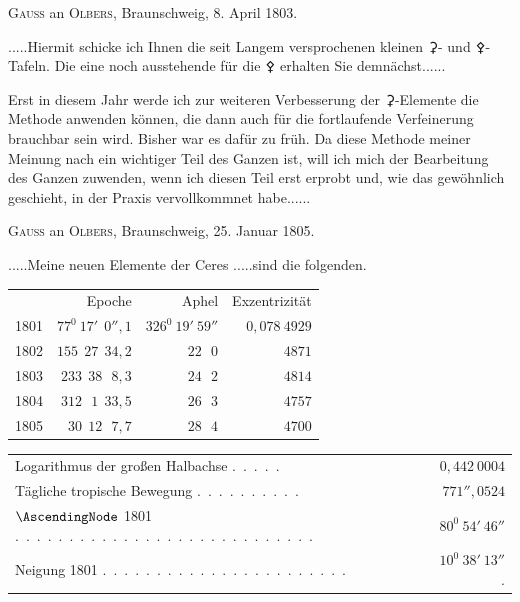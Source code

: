 \begin{center}
\textsc{Gauss} an \textsc{Olbers}, Braunschweig, 8. April 1803.
\end{center}
\noindent\hspace*{\parindent}.\quad.\quad.\quad.\quad.\quad Hiermit schicke ich Ihnen die seit Langem versprochenen kleinen {\AstroSymbols ⚳}- und {\AstroSymbols ⚴}-Tafeln. Die eine noch ausstehende für die {\AstroSymbols ⚴} erhalten Sie demnächst.\quad.\quad.\quad.\quad.\quad.

Erst in diesem Jahr werde ich zur weiteren Verbesserung der {\AstroSymbols ⚳}-Elemente die Methode anwenden können, die dann auch für die fortlaufende Verfeinerung brauchbar sein wird. Bisher war es dafür zu früh. Da diese Methode meiner Meinung nach ein wichtiger Teil des Ganzen ist, will ich mich der Bearbeitung des Ganzen zuwenden, wenn ich diesen Teil erst  erprobt und, wie das gewöhnlich geschieht, in der Praxis vervollkommnet habe.\quad.\quad.\quad.\quad.\quad.

\begin{center}
\textsc{Gauss} an \textsc{Olbers}, Braunschweig, 25. Januar 1805.
\end{center}
\noindent\hspace*{\parindent}.\quad.\quad.\quad.\quad.\quad Meine neuen Elemente der Ceres .\quad.\quad.\quad.\quad.\quad sind die folgenden.
\begin{center}
\begingroup\small\setlength{\tabcolsep}{5pt}\renewcommand{\arraystretch}{1.25}
\begin{tabular}{r r r r}
 & Epoche & Aphel & Exzentrizität\\
1801 & \(77^0\ 17'\ \ 0''{,}1\) & \(326^0\ 19'\ 59''\) & \(0{,}078\ 4929\)\\
1802 & \(155\ \ 27\ \ 34{,}2\) & \(22\ \ \ 0\) & \(4871\)\\
1803 & \(233\ \ 38\ \ \ 8{,}3\) & \(24\ \ \ 2\) & \(4814\)\\
1804 & \(312\ \ \ 1\ \ 33{,}5\) & \(26\ \ \ 3\) & \(4757\)\\
1805 & \(30\ \ 12\ \ \ 7{,}7\) & \(28\ \ \ 4\) & \(4700\)
\end{tabular}\endgroup
\end{center}
\begin{center}
\begingroup\footnotesize\setlength{\tabcolsep}{2pt}\renewcommand{\arraystretch}{1.25}
\begin{tabular}{l@{\quad}r}
Logarithmus der großen Halbachse .\ .\ .\ .\ . & \(0{,}442\ 0004\)\\
Tägliche tropische Bewegung .\ .\ .\ .\ .\ .\ .\ .\ .\ . & \(771''{,}0524\)\\
\(\AscendingNode\) 1801 .\ .\ .\ .\ .\ .\ .\ .\ .\ .\ .\ .\ .\ .\ .\ .\ .\ .\ .\ .\ .\ .\ .\ .\ .\ .\ .\ . & \(80^0\ 54'\ 46''\)\\
Neigung 1801 .\ .\ .\ .\ .\ .\ .\ .\ .\ .\ .\ .\ .\ .\ .\ .\ .\ .\ .\ .\ .\ .\ . & \(10^0\ 38'\ 13''\).
\end{tabular}\endgroup
\end{center}

